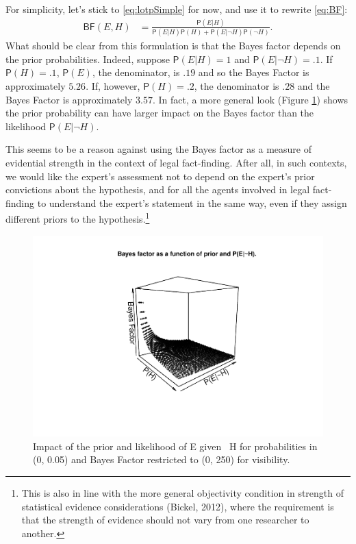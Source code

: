 \documentclass[
  10pt,
  dvipsnames,enabledeprecatedfontcommands]{scrartcl}
\newcommand{\raf}[1]{\todo[color=olive!40]{#1}}
\newcommand{\n}{\neg}
\newcommand{\pr}[1]{\mathsf{P}(#1)}
\begin{document}
\noindent For simplicity, let's stick to \eqref{eq:lotpSimple} for now,
and use it to rewrite \eqref{eq:BF}: \begin{align}\label{eq:BFlotp}
\mathsf{BF}(E,H) & = \frac{\pr{E \vert H}}{\pr{E \vert H} \pr{H}+\pr{E \vert \neg H} \pr{\neg H}}.
\end{align} \noindent What should be clear from this formulation is that
the Bayes factor depends on the prior probabilities. Indeed, suppose
\(\pr{E \vert H} = 1\) and \(\pr{E \vert \neg H} = .1\). If
\(\pr{H}=.1\), \raf{A: shouldn't P(E) have some value here?} \(\pr{E}\),
the denominator, is \(.19\) and so the Bayes Factor is approximately
\(5.26\). If, however, \(\pr{H} =.2\), the denominator is \(.28\) and
the Bayes Factor is approximately \(3.57\). In fact, a more general look
(Figure \ref{fig:BayesFactorPrior}) shows the prior probability can have
larger impact on the Bayes factor than the likelihood
\(\pr{E \vert \n H}\).

This seems to be a reason against using the Bayes factor as a measure of
evidential strength in the context of legal fact-finding. After all, in
such contexts, we would like the expert's assessment not to depend on
the expert's prior convictions about the hypothesis, and for all the
agents involved in legal fact-finding to understand the expert's
statement in the same way, even if they assign different priors to the
hypothesis.\footnote{This is also in line with the more general
  objectivity condition in strength of statistical evidence
  considerations (Bickel, 2012), where the requirement is that the
  strength of evidence should not vary from one researcher to another.}

\footnotesize

\normalsize

\begin{figure}


\begin{center}\includegraphics[width=1\linewidth]{lr-chapter3_files/figure-latex/fig-BayesFactorPrior-1} \end{center}
\caption{Impact of the prior and likelihood of E given ~H for probabilities in (0, 0.05) and Bayes Factor restricted to (0, 250) for visibility.}
\label{fig:BayesFactorPrior}
\end{figure}
\end{document}
